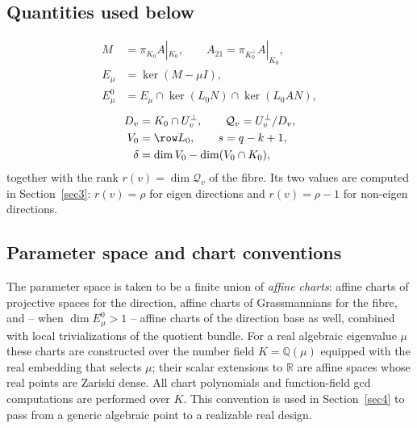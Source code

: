 \subsection{Quantities used below}
\label{sec:prelim:quantities}

\begin{equation}
  \label{eq:compression}
  \begin{aligned}
    M&=\pi_{K_0}A|_{K_0},\qquad A_{21}=\pi_{K_0^\perp}A|_{K_0},\\
    E_\mu&=\ker(M-\mu I),\\
    E_\mu^0&=E_\mu\cap\ker(L_0N)\cap\ker(L_0AN),
  \end{aligned}
\end{equation}
\begin{equation}
  \label{eq:fibre-data}
  \begin{aligned}
    D_v&=K_0\cap U_v^\perp,\qquad \mathcal Q_v=U_v^\perp/D_v,\\
    V_0&=\row L_0,\qquad s=q-k+1,\\
    \delta&=\dim V_0-\dim(V_0\cap K_0),
  \end{aligned}
\end{equation}
together with the rank $r(v)=\dim\mathcal Q_v$ of the fibre. Its two values are computed in
Section~\ref{sec3}: $r(v)=\rho$ for eigen directions and $r(v)=\rho-1$ for non-eigen
directions.

\subsection{Parameter space and chart conventions}
\label{sec:prelim:charts}

The parameter space is taken to be a finite union of \emph{affine charts}: affine charts of projective
spaces for the direction, affine charts of Grassmannians for the fibre, and -- when
$\dim E_\mu^0>1$ -- affine charts of the direction base as well, combined with local trivializations of
the quotient bundle. For a real algebraic eigenvalue $\mu$ these charts are constructed over the number
field $K=\mathbb Q(\mu)$ equipped with the real embedding that selects $\mu$; their scalar extensions to
$\mathbb R$ are affine spaces whose real points are Zariski dense. All chart polynomials and
function-field gcd computations are performed over $K$. This convention is used in
Section~\ref{sec4} to pass from a generic algebraic point to a realizable real design.
